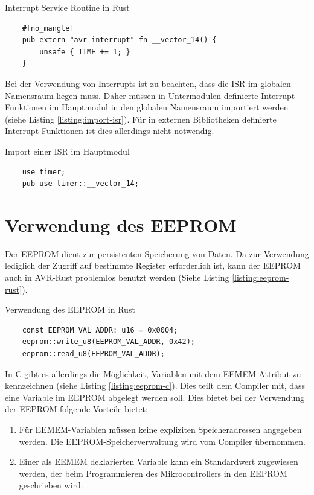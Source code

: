 \documentclass
[ 12pt,
  parskip=half %
]{scrreprt}
\newenvironment{mylisting}[1][H]
{\captionsetup{aboveskip=-0.2\normalbaselineskip}\begin{listing}[#1]}
{\end{listing}}
\begin{document}
\begin{mylisting}
	\caption{Interrupt Service Routine in Rust}
	\label{listing:isr-example}
	\begin{verbatim}
	#[no_mangle]
	pub extern "avr-interrupt" fn __vector_14() {
		unsafe { TIME += 1; } 
	}
	\end{verbatim}
\end{mylisting} 
	
Bei der Verwendung von Interrupts ist zu beachten, dass die ISR im globalen Namensraum liegen muss. Daher müssen in Untermodulen definierte Interrupt-Funktionen im Hauptmodul in den globalen Namensraum importiert werden (siehe Listing \ref{listing:import-isr}). Für in externen Bibliotheken definierte Interrupt-Funktionen ist dies allerdings nicht notwendig.

\begin{mylisting}
	\caption{Import einer ISR im Hauptmodul}
	\label{listing:import-isr}
	\begin{verbatim}
	use timer;
	pub use timer::__vector_14;
	\end{verbatim}
\end{mylisting} 

\section{Verwendung des EEPROM}

Der EEPROM dient zur persistenten Speicherung von Daten. Da zur Verwendung lediglich der Zugriff auf bestimmte Register erforderlich ist, kann der EEPROM auch in AVR-Rust problemlos benutzt werden (Siehe Listing \ref{listing:eeprom-rust}).

\begin{mylisting}
	\caption{Verwendung des EEPROM in Rust}
	\label{listing:eeprom-rust}
	\begin{verbatim}
	const EEPROM_VAL_ADDR: u16 = 0x0004;
	eeprom::write_u8(EEPROM_VAL_ADDR, 0x42);
	eeprom::read_u8(EEPROM_VAL_ADDR);
	\end{verbatim}
\end{mylisting} 

In C gibt es allerdings die Möglichkeit, Variablen mit dem EEMEM-Attribut zu kennzeichnen (siehe Listing \ref{listing:eeprom-c}). Dies teilt dem Compiler mit, dass eine Variable im EEPROM abgelegt werden soll. Dies bietet bei der Verwendung der EEPROM folgende Vorteile bietet:
\begin{enumerate}
	\item Für EEMEM-Variablen müssen keine expliziten Speicheradressen angegeben werden. Die EEPROM-Speicherverwaltung wird vom Compiler übernommen.
	\item Einer als EEMEM deklarierten Variable kann ein Standardwert zugewiesen werden, der beim Programmieren des Mikrocontrollers in den EEPROM geschrieben wird.
\end{enumerate}
\end{document}
